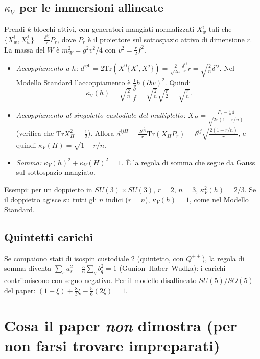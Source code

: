 \documentclass[11pt,a4paper]{article}
\numberwithin{equation}{section}
\theoremstyle{remark}
\newcommand{\Tr}{\mathrm{Tr}}
\newcommand{\one}{\mathbb{1}}
\begin{document}
\subsection{$\kappa_V$ per le immersioni allineate}

Prendi $k$ blocchi attivi, con generatori mangiati normalizzati $X_w^i$ tali che $\{X^i_w,X^j_w\}=\frac{\delta^{ij}}{r}P_r$, dove $P_r$ è il proiettore sul sottospazio attivo di dimensione $r$. La massa del $W$ è $m_W^2=g^2v^2/4$ con $v^2=\frac r2f^2$.
\begin{itemize}
\item \emph{Accoppiamento a $h$:} $d^{ij0}=2\Tr(X^0\{X^i,X^j\})=\frac{2}{\sqrt{2n}}\frac{\delta^{ij}}{r}r=\sqrt{\frac2n}\delta^{ij}$. Nel Modello Standard l'accoppiamento è $\frac1v h(\partial w)^2$. Quindi
\[
\kappa_V(h)=\sqrt{\tfrac2n}\,\frac vf=\sqrt{\tfrac2n}\sqrt{\tfrac r2}=\sqrt{\tfrac rn}.
\]
\item \emph{Accoppiamento al singoletto custodiale del multipletto:} $X_H=\frac{P_r-\frac rn\one}{\sqrt{2r(1-r/n)}}$ (verifica che $\Tr X_H^2=\frac12$). Allora $d^{ijH}=\frac{2\delta^{ij}}{r}\Tr(X_HP_r)=\delta^{ij}\sqrt{\frac{2(1-r/n)}{r}}$, e quindi $\kappa_V(H)=\sqrt{1-r/n}$.
\item \emph{Somma:} $\kappa_V(h)^2+\kappa_V(H)^2=1$. \checkmark È la regola di somma che segue da Gauss sul sottospazio mangiato.
\end{itemize}
Esempi: per un doppietto in $SU(3)\times SU(3)$, $r=2$, $n=3$, $\kappa_V^2(h)=2/3$. Se il doppietto agisce su tutti gli $n$ indici ($r=n$), $\kappa_V(h)=1$, come nel Modello Standard.

\subsection{Quintetti carichi}

Se compaiono stati di isospin custodiale 2 (quintetto, con $Q^{\pm\pm}$), la regola di somma diventa $\sum_sa_s^2-\frac56\sum_qb_q^2=1$ (Gunion--Haber--Wudka): i carichi contribuiscono con segno negativo. Per il modello disallineato $SU(5)/SO(5)$ del paper: $(1-\xi)+\frac83\xi-\frac56(2\xi)=1$. \checkmark

\section{Cosa il paper \emph{non} dimostra (per non farsi trovare impreparati)}
\end{document}
